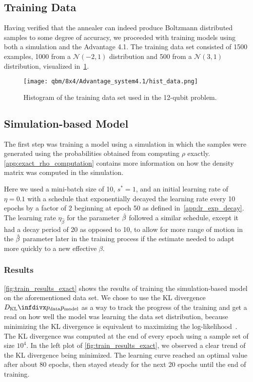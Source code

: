 \subsection{Training Data}
Having verified that the annealer can indeed produce Boltzmann distributed samples to some degree of accuracy, we proceeded with training models using both a simulation and the Advantage 4.1.
The training data set consisted of 1500 examples, 1000 from a \( \mathcal{N}(-2, 1) \) distribution and 500 from a \( \mathcal{N}(3, 1) \) distribution, visualized in~\cref{fig:hist_data}.
\begin{figure}[!htb]
    \begin{center}
        \texttt{[image: qbm/8x4/Advantage\_system4.1/hist\_data.png]}
    \end{center}
    \caption{
        Histogram of the training data set used in the 12-qubit problem.
    }
    \label{fig:hist_data}
\end{figure}

\subsection{Simulation-based Model}
The first step was training a model using a simulation in which the samples were generated using the probabilities obtained from computing \( \rho \) exactly.
\cref{app:exact_rho_computation} contains more information on how the density matrix was computed in the simulation.

Here we used a mini-batch size of 10, \( s^* = 1 \), and an initial learning rate of \( \eta = 0.1 \) with a schedule that exponentially decayed the learning rate every 10 epochs by a factor of 2 beginning at epoch 50 as defined in~\cref{app:lr_exp_decay}.
The learning rate \( \eta_{\hat{\beta}} \) for the parameter \( \hat{\beta} \) followed a similar schedule, except it had a decay period of 20 as opposed to 10, to allow for more range of motion in the \( \hat{\beta} \) parameter later in the training process if the estimate needed to adapt more quickly to a new effective \( \beta \).

\subsubsection{Results}\label{sec:qbm_simulation_results}
\cref{fig:train_results_exact} shows the results of training the simulation-based model on the aforementioned data set.
We chose to use the KL divergence \( \DKL{\pdata}{\pmodel} \) as a way to track the progress of the training and get a read on how well the model was learning the data set distribution, because minimizing the KL divergence is equivalent to maximizing the log-likelihood~\cite{murphy_2012}.
The KL divergence was computed at the end of every epoch using a sample set of size \( 10^4 \).
In the left plot of \cref{fig:train_results_exact}, we observed a clear trend of the KL divergence being minimized.
The learning curve reached an optimal value after about 80 epochs, then stayed steady for the next 20 epochs until the end of training.

